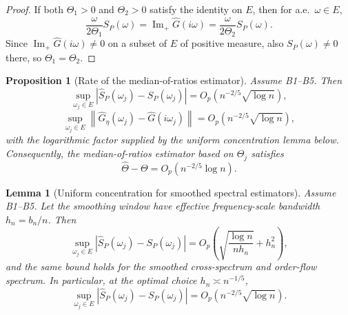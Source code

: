 \documentclass[11pt]{article}
\newtheorem{proposition}[theorem]{Proposition}
\newtheorem{lemma}[theorem]{Lemma}
\newcommand{\Ghat}{\widehat{G}}
\newcommand{\ImPart}{\operatorname{Im}_{\!+}}
\newcommand{\REV}{}
\begin{document}
\begin{proof}
If both $\Theta_1>0$ and $\Theta_2>0$ satisfy the identity on $E$, then for a.e.\ $\omega\in E$,
\[
  \frac{\omega}{2\Theta_1}S_P(\omega)=\ImPart \Ghat(i\omega)=\frac{\omega}{2\Theta_2}S_P(\omega).
\]
Since $\ImPart \Ghat(i\omega)\neq 0$ on a subset of $E$ of positive measure, also $S_P(\omega)\neq 0$ there, so $\Theta_1=\Theta_2$.
\end{proof}

\begin{proposition}[Rate of the median-of-ratios estimator]\label{prop:theta-rate}\REV
Assume B1--B5. Then
\[
  \sup_{\omega_j\in E}\left|\widehat{S}_P(\omega_j)-S_P(\omega_j)\right|
  =O_p\!\left(n^{-2/5}\sqrt{\log n}\right),
\]
\[
  \sup_{\omega_j\in E}\left\|\widehat{G}_\eta(\omega_j)-\Ghat(i\omega_j)\right\|
  =O_p\!\left(n^{-2/5}\sqrt{\log n}\right),
\]
with the logarithmic factor supplied by the uniform concentration lemma below. Consequently, the median-of-ratios estimator based on $\widehat{\Theta}_j$ satisfies
\[
  \widehat{\Theta}-\Theta = O_p\!\left(n^{-2/5}\log n\right).
\]
\end{proposition}

\begin{lemma}[Uniform concentration for smoothed spectral estimators]\label{lem:uniform-spectral}\REV
Assume B1--B5. Let the smoothing window have effective frequency-scale bandwidth $h_n=b_n/n$. Then
\[
  \sup_{\omega_j\in E}\left|\widehat{S}_P(\omega_j)-S_P(\omega_j)\right|
  =
  O_p\!\left(\sqrt{\frac{\log n}{n h_n}}+h_n^2\right),
\]
and the same bound holds for the smoothed cross-spectrum and order-flow spectrum. In particular, at the optimal choice $h_n\asymp n^{-1/5}$,
\[
  \sup_{\omega_j\in E}\left|\widehat{S}_P(\omega_j)-S_P(\omega_j)\right|
  =
  O_p\!\left(n^{-2/5}\sqrt{\log n}\right).
\]
\end{lemma}
\end{document}
